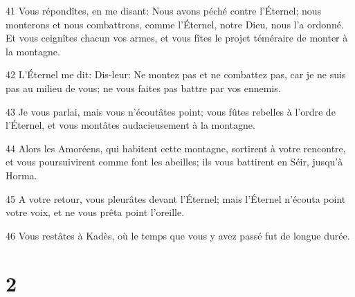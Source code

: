 \par 41 Vous répondîtes, en me disant: Nous avons péché contre l'Éternel; nous monterons et nous combattrons, comme l'Éternel, notre Dieu, nous l'a ordonné. Et vous ceignîtes chacun vos armes, et vous fîtes le projet téméraire de monter à la montagne.
\par 42 L'Éternel me dit: Dis-leur: Ne montez pas et ne combattez pas, car je ne suis pas au milieu de vous; ne vous faites pas battre par vos ennemis.
\par 43 Je vous parlai, mais vous n'écoutâtes point; vous fûtes rebelles à l'ordre de l'Éternel, et vous montâtes audacieusement à la montagne.
\par 44 Alors les Amoréens, qui habitent cette montagne, sortirent à votre rencontre, et vous poursuivirent comme font les abeilles; ils vous battirent en Séir, jusqu'à Horma.
\par 45 A votre retour, vous pleurâtes devant l'Éternel; mais l'Éternel n'écouta point votre voix, et ne vous prêta point l'oreille.
\par 46 Vous restâtes à Kadès, où le temps que vous y avez passé fut de longue durée.

\chapter{2}


